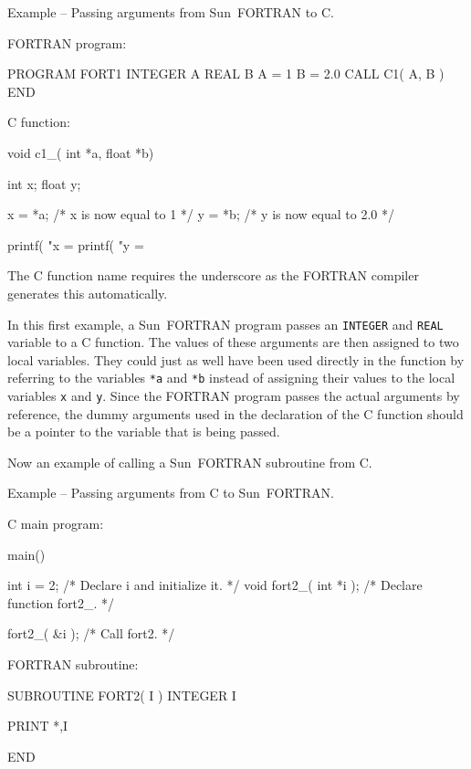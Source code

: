 \documentclass[twoside,11pt,nolof]{starlink}
\newcounter{examples}
\begin{document}
\label{sun_f2c}
\begin{center}
Example\latex{~\ref{sun_f2c}}
-- Passing arguments from Sun~FORTRAN to C\@.
\end{center}
\nopagebreak[4]
FORTRAN program:
\nopagebreak[4]
\begin{small}
\begin{terminalv}
      PROGRAM FORT1
      INTEGER A
      REAL B
      A = 1
      B = 2.0
      CALL C1( A, B )
      END
\end{terminalv}
\end{small}
\pagebreak[1]
C function:
\nopagebreak[4]
\begin{small}
\begin{terminalv}
void c1_( int *a, float *b)
{
  int x;
  float y;

  x = *a;    /* x is now equal to 1 */
  y = *b;    /* y is now equal to 2.0 */

  printf( "x = %
  printf( "y = %
}
\end{terminalv}
\end{small}

The C function name requires the underscore as the FORTRAN compiler generates
this automatically.

In this first example, a Sun~FORTRAN program passes an \texttt{INTEGER} and
\texttt{REAL} variable to a C function.
The values of these arguments are then assigned to
two local variables. They could just as well have been used directly in the
function by referring to the variables \texttt{*a} and \texttt{*b} instead of
assigning their values to the local variables \texttt{x} and \texttt{y}.
Since the FORTRAN program passes the actual arguments by reference, the dummy
arguments used in the declaration of the C function should be a pointer to the
variable that is being passed.

Now an example of calling a Sun~FORTRAN subroutine from C\@.

\label{sun_c2f}
\begin{center}
Example\latex{~\ref{sun_c2f}}
-- Passing arguments from C to Sun~FORTRAN\@.
\end{center}
\nopagebreak[4]
C main program:
\nopagebreak[4]
\begin{small}
\begin{terminalv}
main()
{
 int  i = 2;             /* Declare i and initialize it.  */
 void fort2_( int *i );  /* Declare function fort2_. */

 fort2_( &i );           /* Call fort2.  */
}
\end{terminalv}
\end{small}
\pagebreak[1]
FORTRAN subroutine:
\nopagebreak[4]
\begin{small}
\begin{terminalv}
      SUBROUTINE FORT2( I )
      INTEGER I

      PRINT *,I

      END
\end{terminalv}
\end{small}
\end{document}
